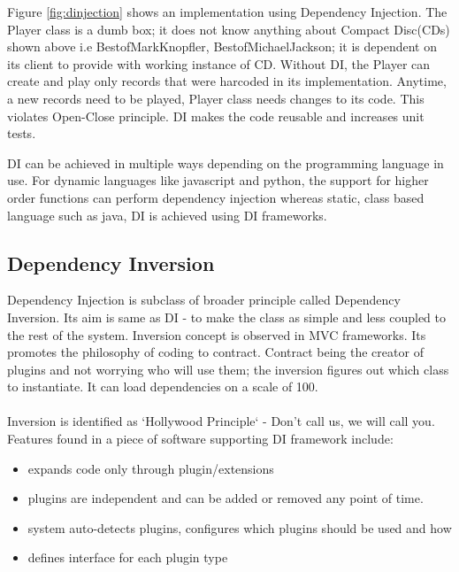 \noindent
Figure \ref{fig:dinjection} shows an implementation using Dependency Injection. The Player class is a dumb box; it does not know anything about Compact Disc(CDs) shown above i.e BestofMarkKnopfler, BestofMichaelJackson; it is dependent on its client to provide with working instance of CD. Without DI, the Player can
create and play only records that were harcoded in its implementation. Anytime, a new records need to be
played, Player class needs changes to its code. This violates Open-Close principle. DI makes the code
reusable and increases unit tests.

\noindent
DI can be achieved in multiple ways depending on the programming language in use. For dynamic languages
like javascript and python, the support for higher order functions can perform dependency injection
whereas static, class based language such as java, DI is achieved using DI frameworks.

\pagebreak

\subsection{Dependency Inversion}
Dependency Injection is subclass of broader principle called Dependency Inversion. Its aim is same as
DI - to make the class as simple and less coupled to the rest of the system. Inversion concept is observed
in MVC frameworks. Its promotes the philosophy of coding to contract. Contract being the creator of plugins
and not worrying who will use them; the inversion figures out which class to instantiate. It can load
dependencies on a scale of 100.
\\
\\
\noindent
Inversion is identified as `Hollywood Principle` - Don't call us, we will call you. Features found in a
piece of software supporting DI framework include:
\begin{itemize}
  \item expands code only through plugin/extensions
  \item plugins are independent and can be added or removed any point of time.
  \item system auto-detects plugins, configures which plugins should be used and how
  \item defines interface for each plugin type
\end{itemize}


\pagebreak

